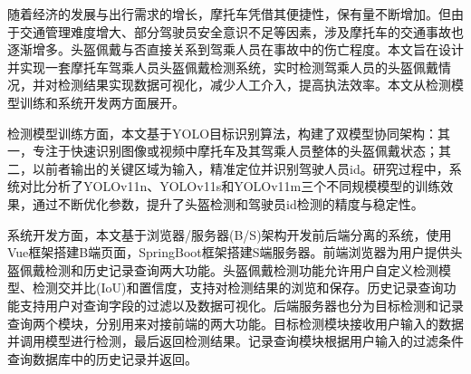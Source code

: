 随着经济的发展与出行需求的增长，摩托车凭借其便捷性，保有量不断增加。但由于交通管理难度增大、部分驾驶员安全意识不足等因素，涉及摩托车的交通事故也逐渐增多。头盔佩戴与否直接关系到驾乘人员在事故中的伤亡程度。本文旨在设计并实现一套摩托车驾乘人员头盔佩戴检测系统，实时检测驾乘人员的头盔佩戴情况，并对检测结果实现数据可视化，减少人工介入，提高执法效率。本文从检测模型训练和系统开发两方面展开。

检测模型训练方面，本文基于YOLO目标识别算法，构建了双模型协同架构：其一，专注于快速识别图像或视频中摩托车及其驾乘人员整体的头盔佩戴状态；其二，以前者输出的关键区域为输入，精准定位并识别驾驶人员id。研究过程中，系统对比分析了YOLOv11n、YOLOv11s和YOLOv11m三个不同规模模型的训练效果，通过不断优化参数，提升了头盔检测和驾驶员id检测的精度与稳定性。

系统开发方面，本文基于浏览器/服务器(B/S)架构开发前后端分离的系统，使用Vue框架搭建B端页面，SpringBoot框架搭建S端服务器。前端浏览器为用户提供头盔佩戴检测和历史记录查询两大功能。头盔佩戴检测功能允许用户自定义检测模型、检测交并比(IoU)和置信度，支持对检测结果的浏览和保存。历史记录查询功能支持用户对查询字段的过滤以及数据可视化。后端服务器也分为目标检测和记录查询两个模块，分别用来对接前端的两大功能。目标检测模块接收用户输入的数据并调用模型进行检测，最后返回检测结果。记录查询模块根据用户输入的过滤条件查询数据库中的历史记录并返回。